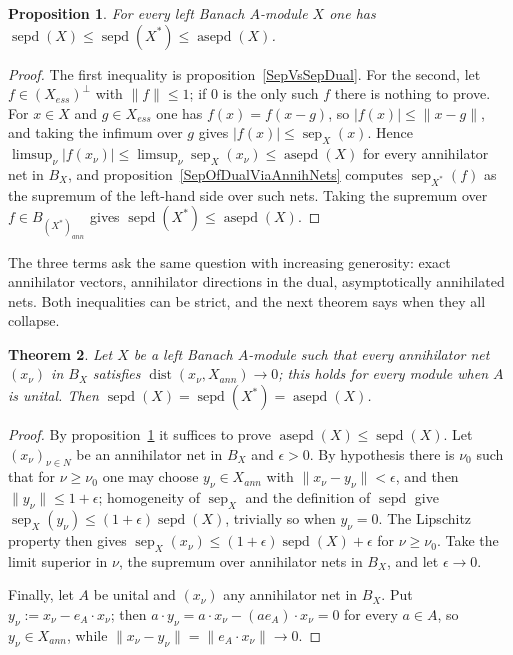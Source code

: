 \documentclass[11pt]{article}
\theoremstyle{plain}
\newtheorem{theorem}{Theorem}[section]
\newtheorem{proposition}[theorem]{Proposition}
\theoremstyle{definition}
\DeclareMathOperator{\dist}{dist}
\DeclareMathOperator{\sep}{sep}
\DeclareMathOperator{\sepd}{sepd}
\DeclareMathOperator{\asepd}{asepd}
\begin{document}
\begin{proposition}\label{TheChain}
For every left Banach $A$-module $X$ one has
$\sepd(X)\leq\sepd(X^*)\leq\asepd(X)$.
\end{proposition}

\begin{proof}
The first inequality is proposition~\ref{SepVsSepDual}. For the second, let
$f\in{(X_{ess})}^\perp$ with $\lVert f\rVert\leq 1$; if $0$ is the only such $f$
there is nothing to prove. For $x\in X$ and $g\in X_{ess}$ one has $f(x)=f(x-g)$,
so $|f(x)|\leq\lVert x-g\rVert$, and taking the infimum over $g$ gives
$|f(x)|\leq\sep_X(x)$. Hence
$\limsup_\nu|f(x_\nu)|\leq\limsup_\nu\sep_X(x_\nu)\leq\asepd(X)$ for every
annihilator net in $B_X$, and proposition~\ref{SepOfDualViaAnnihNets} computes
$\sep_{X^*}(f)$ as the supremum of the left-hand side over such nets. Taking the
supremum over $f\in B_{{(X^*)}_{ann}}$ gives $\sepd(X^*)\leq\asepd(X)$.
\end{proof}

The three terms ask the same question with increasing generosity: exact
annihilator vectors, annihilator directions in the dual, asymptotically
annihilated nets. Both inequalities can be strict, and the next theorem says when
they all collapse.

\begin{theorem}\label{AsympSepDirectionalUnital}
Let $X$ be a left Banach $A$-module such that every annihilator net ${(x_\nu)}$
in $B_X$ satisfies $\dist(x_\nu,X_{ann})\to 0$; this holds for every module when
$A$ is unital. Then $\sepd(X)=\sepd(X^*)=\asepd(X)$.
\end{theorem}

\begin{proof}
By proposition~\ref{TheChain} it suffices to prove $\asepd(X)\leq\sepd(X)$. Let
${(x_\nu)}_{\nu\in N}$ be an annihilator net in $B_X$ and $\epsilon>0$. By
hypothesis there is $\nu_0$ such that for $\nu\geq\nu_0$ one may choose
$y_\nu\in X_{ann}$ with $\lVert x_\nu-y_\nu\rVert<\epsilon$, and then
$\lVert y_\nu\rVert\leq 1+\epsilon$; homogeneity of $\sep_X$ and the definition
of $\sepd$ give $\sep_X(y_\nu)\leq(1+\epsilon)\sepd(X)$, trivially so when
$y_\nu=0$. The Lipschitz property then gives
$\sep_X(x_\nu)\leq(1+\epsilon)\sepd(X)+\epsilon$ for $\nu\geq\nu_0$. Take the
limit superior in $\nu$, the supremum over annihilator nets in $B_X$, and let
$\epsilon\to 0$.

Finally, let $A$ be unital and ${(x_\nu)}$ any annihilator net in $B_X$. Put
$y_\nu:=x_\nu-e_A\cdot x_\nu$; then
$a\cdot y_\nu=a\cdot x_\nu-(ae_A)\cdot x_\nu=0$ for every $a\in A$, so
$y_\nu\in X_{ann}$, while
$\lVert x_\nu-y_\nu\rVert=\lVert e_A\cdot x_\nu\rVert\to 0$.
\end{proof}
\end{document}
